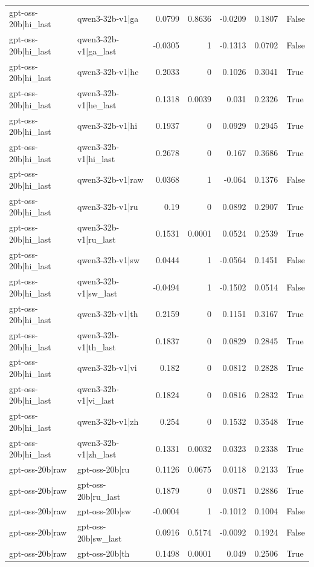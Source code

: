\begin{table}
\begin{tabular}{l l r r r r l}
gpt-oss-20b|hi_last & qwen3-32b-v1|ga & 0.0799 & 0.8636 & -0.0209 & 0.1807 & False \\
gpt-oss-20b|hi_last & qwen3-32b-v1|ga_last & -0.0305 & 1 & -0.1313 & 0.0702 & False \\
gpt-oss-20b|hi_last & qwen3-32b-v1|he & 0.2033 & 0 & 0.1026 & 0.3041 & True \\
gpt-oss-20b|hi_last & qwen3-32b-v1|he_last & 0.1318 & 0.0039 & 0.031 & 0.2326 & True \\
gpt-oss-20b|hi_last & qwen3-32b-v1|hi & 0.1937 & 0 & 0.0929 & 0.2945 & True \\
gpt-oss-20b|hi_last & qwen3-32b-v1|hi_last & 0.2678 & 0 & 0.167 & 0.3686 & True \\
gpt-oss-20b|hi_last & qwen3-32b-v1|raw & 0.0368 & 1 & -0.064 & 0.1376 & False \\
gpt-oss-20b|hi_last & qwen3-32b-v1|ru & 0.19 & 0 & 0.0892 & 0.2907 & True \\
gpt-oss-20b|hi_last & qwen3-32b-v1|ru_last & 0.1531 & 0.0001 & 0.0524 & 0.2539 & True \\
gpt-oss-20b|hi_last & qwen3-32b-v1|sw & 0.0444 & 1 & -0.0564 & 0.1451 & False \\
gpt-oss-20b|hi_last & qwen3-32b-v1|sw_last & -0.0494 & 1 & -0.1502 & 0.0514 & False \\
gpt-oss-20b|hi_last & qwen3-32b-v1|th & 0.2159 & 0 & 0.1151 & 0.3167 & True \\
gpt-oss-20b|hi_last & qwen3-32b-v1|th_last & 0.1837 & 0 & 0.0829 & 0.2845 & True \\
gpt-oss-20b|hi_last & qwen3-32b-v1|vi & 0.182 & 0 & 0.0812 & 0.2828 & True \\
gpt-oss-20b|hi_last & qwen3-32b-v1|vi_last & 0.1824 & 0 & 0.0816 & 0.2832 & True \\
gpt-oss-20b|hi_last & qwen3-32b-v1|zh & 0.254 & 0 & 0.1532 & 0.3548 & True \\
gpt-oss-20b|hi_last & qwen3-32b-v1|zh_last & 0.1331 & 0.0032 & 0.0323 & 0.2338 & True \\
gpt-oss-20b|raw & gpt-oss-20b|ru & 0.1126 & 0.0675 & 0.0118 & 0.2133 & True \\
gpt-oss-20b|raw & gpt-oss-20b|ru_last & 0.1879 & 0 & 0.0871 & 0.2886 & True \\
gpt-oss-20b|raw & gpt-oss-20b|sw & -0.0004 & 1 & -0.1012 & 0.1004 & False \\
gpt-oss-20b|raw & gpt-oss-20b|sw_last & 0.0916 & 0.5174 & -0.0092 & 0.1924 & False \\
gpt-oss-20b|raw & gpt-oss-20b|th & 0.1498 & 0.0001 & 0.049 & 0.2506 & True \\

\end{tabular}
\end{table}
